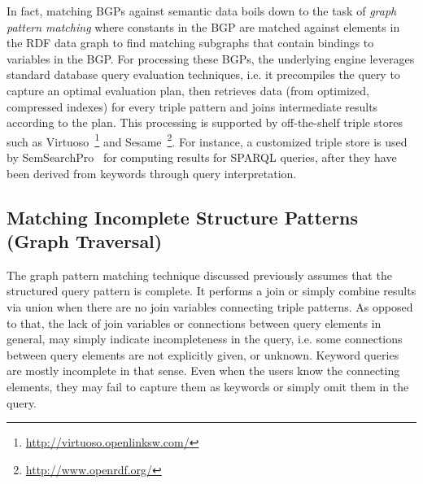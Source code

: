 	In fact, matching BGPs against semantic data boils down to the task of \emph{graph pattern matching} where constants in the BGP are matched against elements in the RDF data graph to find matching subgraphs that contain bindings to variables in the BGP. For processing these BGPs, the underlying engine leverages standard database query evaluation techniques, i.e. it precompiles the query to capture an optimal evaluation plan, then retrieves data (from optimized, compressed indexes) for every triple pattern and joins intermediate results according to the plan. This processing is supported by off-the-shelf triple stores such as Virtuoso~\footnote{\url{http://virtuoso.openlinksw.com/}} and Sesame~\footnote{\url{http://www.openrdf.org/}}. For instance, a customized triple store is used by SemSearchPro~\cite{DBLP:journals/ws/TranHL11} for computing results for SPARQL queries, after they have been derived from keywords through query interpretation. 
	
\subsection{Matching Incomplete Structure Patterns (Graph Traversal)} 
The graph pattern matching technique discussed previously assumes that the structured query pattern is complete. It performs a join or simply combine results via union when there are no join variables connecting triple patterns. As opposed to that, the lack of join variables or connections between query elements in general, may simply indicate incompleteness in the query, i.e. some connections between query elements are not explicitly given, or unknown. 
Keyword queries are mostly incomplete in that sense. Even when the users know the connecting elements, they may fail to capture them as keywords or simply omit them in the query. 
	
